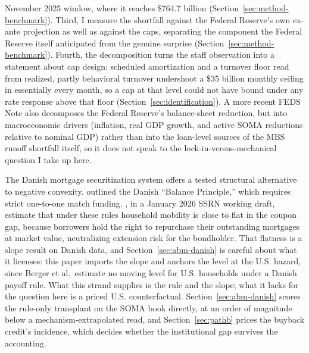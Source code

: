 \documentclass[12pt]{article}
\begin{document}
November 2025 window, where it reaches \$764.7 billion (Section~\ref{sec:method-benchmark}). Third, I measure the shortfall against the Federal Reserve's own ex-ante projection as well as against the caps, separating the component the Federal Reserve itself anticipated from the genuine surprise (Section~\ref{sec:method-benchmark}). Fourth, the decomposition turns the staff observation into a statement about cap design: scheduled amortization and a turnover floor read from realized, partly behavioral turnover undershoot a \$35 billion monthly ceiling in essentially every month, so a cap at that level could not have bound under any rate response above that floor (Section~\ref{sec:identification}). A more recent \citet{eyal2026} FEDS Note also decomposes the Federal Reserve's balance-sheet reduction, but into macroeconomic drivers (inflation, real GDP growth, and active SOMA reductions relative to nominal GDP) rather than into the loan-level sources of the MBS runoff shortfall itself, so it does not speak to the lock-in-versus-mechanical question I take up here.

The Danish mortgage securitization system offers a tested structural alternative to negative convexity. \citet{berg2018} outlined the Danish ``Balance Principle,'' which requires strict one-to-one match funding. \citet[\S3.2.3]{berger2026}, in a January 2026 SSRN working draft, estimate that under these rules household mobility is close to flat in the coupon gap, because borrowers hold the right to repurchase their outstanding mortgages at market value, neutralizing extension risk for the bondholder. That flatness is a slope result on Danish data, and Section~\ref{sec:abm-danish} is careful about what it licenses: this paper imports the slope and anchors the level at the U.S. hazard, since Berger et al.\ estimate no moving level for U.S. households under a Danish payoff rule. What this strand supplies is the rule and the slope; what it lacks for the question here is a priced U.S. counterfactual. Section~\ref{sec:abm-danish} scores the rule-only transplant on the SOMA book directly, at an order of magnitude below a mechanism-extrapolated read, and Section~\ref{sec:pathb} prices the buyback credit's incidence, which decides whether the institutional gap survives the accounting.
\end{document}
